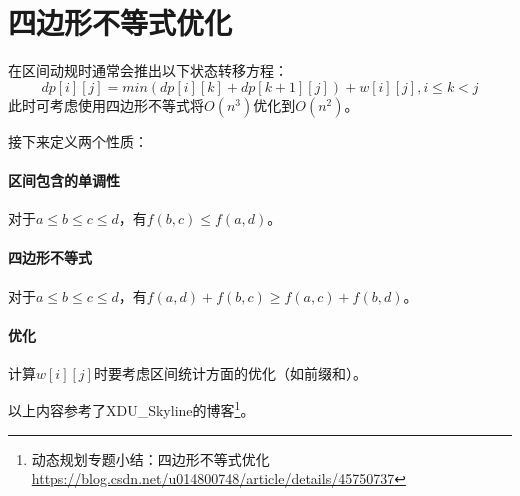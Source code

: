 \section{四边形不等式优化}
在区间动规时通常会推出以下状态转移方程：
\begin{displaymath}
    dp[i][j]=min(dp[i][k]+dp[k+1][j])+w[i][j],i\leq k <j
\end{displaymath}
此时可考虑使用四边形不等式将$O(n^3)$优化到$O(n^2)$。

接下来定义两个性质：
\paragraph{区间包含的单调性}
对于$a\leq b\leq c\leq d$，有$f(b,c)\leq f(a,d)$。
\paragraph{四边形不等式}
对于$a\leq b\leq c\leq d$，有$f(a,d)+f(b,c)\geq f(a,c)+f(b,d)$。

\paragraph{优化} 计算$w[i][j]$时要考虑区间统计方面的优化（如前缀和）。

以上内容参考了XDU\_Skyline的博客\footnote{动态规划专题小结：四边形不等式优化
    \url{https://blog.csdn.net/u014800748/article/details/45750737}
}。
